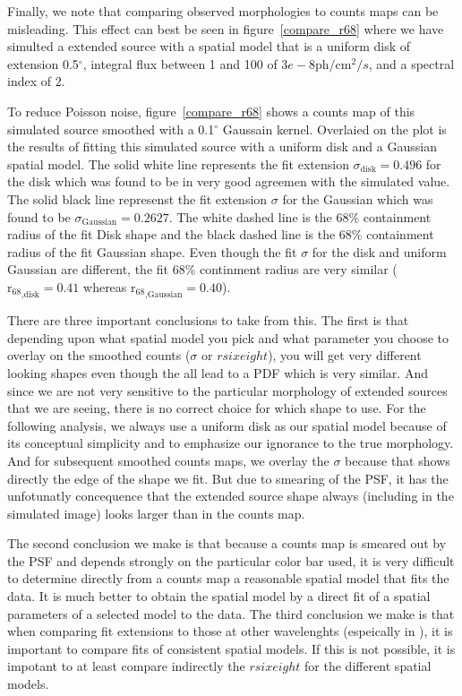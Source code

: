 \documentclass[preprint]{aastex}
\newcommand{\gev}{\text{GeV}\xspace}
\newcommand{\tev}{\text{TeV}\xspace}
\newcommand{\ph}{\text{ph}\xspace}
\newcommand{\cm}{\text{cm}\xspace}
\newcommand{\rsixeight}{{\ensuremath{\text{r}_{68}}}\xspace}
\renewcommand{\deg}{\ensuremath{^\circ}\xspace}
\begin{document}
Finally, we note that comparing observed morphologies to 
counts maps can be misleading.  This effect can best be seen
in figure~\ref{compare_r68} where we have simulted a
extended source with 
a spatial model that is a uniform disk of extension 0.5\deg,
integral flux between 1\gev and 100\gev of $3e-8\ph/\cm^2/s$,
and a spectral index of 2. 

To reduce Poisson noise, figure~\ref{compare_r68} shows a counts map of
this simulated source smoothed with a 0.1\deg Gaussain kernel.  Overlaied
on the plot is the results of fitting this simulated source with a uniform
disk and a Gaussian spatial model.  The solid white line represents the
fit extension $\sigma_\text{disk}=0.496$ for the disk which was found to
be in very good agreemen with the simulated value.  The solid black line
represenst the fit extension $\sigma$ for the Gaussian which was found to
be $\sigma_\text{Gaussian}=0.2627$.  The white dashed line is the 68\%
containment radius of the fit Disk shape and the black dashed line is
the 68\% containment radius of the fit Gaussian shape.  Even though the
fit $\sigma$ for the disk and uniform Gaussian are different, the fit
68\% continment radius are very similar ($\rsixeight_\text{,disk}=0.41$
whereas $\rsixeight_\text{,Gaussian}=0.40$).

There are three important conclusions to take from this. The first is
that depending upon what spatial model you pick and what parameter you
choose to overlay on the smoothed counts ($\sigma$ or $rsixeight$),
you will get very different looking shapes even though the all lead
to a PDF which is very similar. And since we are not very sensitive
to the particular morphology of extended sources that we are seeing,
there is no correct choice for which shape to use. For the following
analysis, we always use a uniform disk as our spatial model because
of its conceptual simplicity and to emphasize our ignorance to the
true morphology. And for subsequent smoothed counts maps, we overlay
the $\sigma$ because that shows directly the edge of the shape we fit.
But due to smearing of the PSF, it has the unfotunatly concequence that
the extended source shape always (including in the simulated image)
looks larger than in the counts map.

The second conclusion we make is that because a counts map is smeared
out by the PSF and depends strongly on the particular color bar used, it
is very difficult to determine directly from a counts map a reasonable
spatial model that fits the data.  It is much better to obtain the
spatial model by a direct fit of a spatial parameters of a selected
model to the data.  The third conclusion we make is that when comparing
fit extensions to those at other wavelenghts (espeically in \tev), it is
important to compare fits of consistent spatial models. If this is not
possible, it is impotant to at least compare indirectly the $rsixeight$
for the different spatial models.
\end{document}
